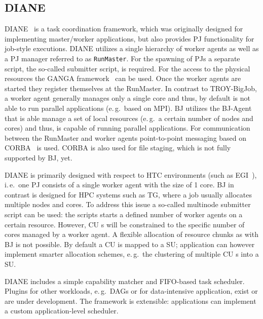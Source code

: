 \documentclass[conference,final]{IEEEtran}
\newcommand{\cu}{CU\xspace}
\newcommand{\upp}{\vspace*{-0.5em}}
\begin{document}
\upp
\subsection{DIANE\upp\upp}

DIANE~\cite{Moscicki:908910} is a task coordination framework, which
was originally designed for implementing master/worker applications,
but also provides PJ functionality for job-style executions. DIANE
utilizes a single hierarchy of worker agents as well as a PJ manager
referred to as \texttt{RunMaster}.
For the spawning of PJs a separate script, the so-called submitter script, is
required. For the access to the physical resources the GANGA
framework~\cite{Moscicki20092303} can be used.
Once the worker agents are started they register themselves at the RunMaster.
In contrast to TROY-BigJob, a worker agent generally manages only a single
core and thus, by default is not able to run parallel applications (e.\,g.\
based on MPI). BJ utilizes the BJ-Agent that is able manage a set of local
resources (e.\,g.\ a certain number of nodes and cores) and thus, is capable
of running parallel applications. For communication between the RunMaster and
worker agents point-to-point messaging based on CORBA~\cite{OMG-CORBA303:2004}
is used. CORBA is also used for file staging, which is not fully supported by
BJ, yet.

DIANE is primarily designed with respect to HTC environments (such as
EGI~\cite{egi}), i.\,e.\ one PJ consists of a single worker agent with the
size of 1 core. BJ in contrast is designed for HPC systems such as TG,
where a job usually allocates multiple nodes and cores. To address this issue
a so-called multinode submitter script can be used: the scripts starts a
defined number of worker agents on a certain resource. However, \cu s will be
constrained to the specific number of cores managed by a worker agent. A
flexible allocation of resource chunks as with BJ is not possible. By
default a \cu  is mapped to a SU; application can however implement smarter
allocation schemes, e.\,g.\ the clustering of multiple \cu s into a SU.

DIANE includes a simple capability matcher and FIFO-based task scheduler.
Plugins for other workloads, e.\,g.\ DAGs or for data-intensive
application, exist or are under development. The framework is extensible:
applications can implement a custom application-level scheduler.
\end{document}
